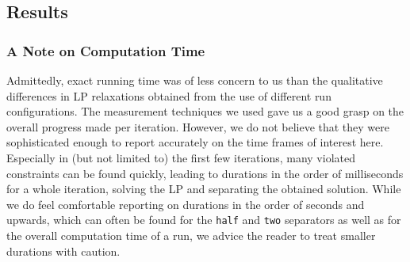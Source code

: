 \subsection{Results}\label{subsec:experiments_results}
\subsubsection{A Note on Computation Time}
Admittedly, exact running time was of less concern to us than the qualitative differences in LP relaxations obtained from the use of different run configurations.
The measurement techniques we used gave us a good grasp on the overall progress made per iteration.
However, we do not believe that they were sophisticated enough to report accurately on the time frames of interest here.
Especially in (but not limited to) the first few iterations, many violated constraints can be found quickly, leading to durations in the order of milliseconds for a whole iteration, \ie solving the LP and separating the obtained solution.
While we do feel comfortable reporting on durations in the order of seconds and upwards, which can often be found for the \texttt{half} and \texttt{two} separators as well as for the overall computation time of a run, we advice the reader to treat smaller durations with caution.
